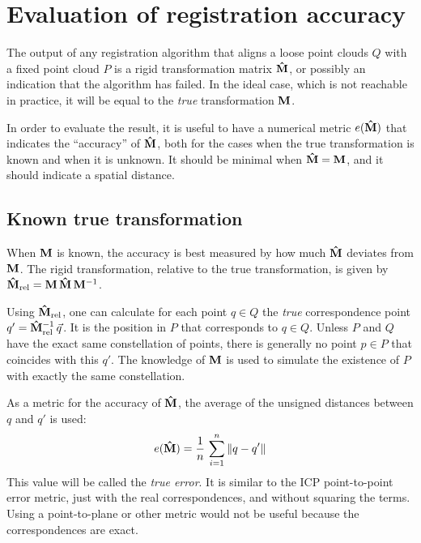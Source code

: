 \section{Evaluation of registration accuracy}
The output of any registration algorithm that aligns a loose point clouds $Q$ with a fixed point cloud $P$ is a rigid transformation matrix $\mathbf{\hat{M}}$, or possibly an indication that the algorithm has failed. In the ideal case, which is not reachable in practice, it will be equal to the \emph{true} transformation $\mathbf{M}$.

In order to evaluate the result, it is useful to have a numerical metric $e(\mathbf{\hat{M}})$ that indicates the ``accuracy'' of  $\mathbf{\hat{M}}$, both for the cases when the true transformation is known and when it is unknown. It should be minimal when $\mathbf{\hat{M}} = \mathbf{M}$, and it should indicate a spatial distance.



\subsection{Known true transformation} \label{sec:lm_known_ttrans}
When $\mathbf{M}$ is known, the accuracy is best measured by how much $\mathbf{\hat{M}}$ deviates from $\mathbf{M}$. The rigid transformation, relative to the true transformation, is given by $\mathbf{\hat{M}}_{\text{rel}} = \mathbf{M} \, \mathbf{\hat{M}} \, \mathbf{M}^{-1}$.

Using $\mathbf{\hat{M}}_{\text{rel}}$, one can calculate for each point $q \in Q$ the \emph{true} correspondence point $q' = \mathbf{\hat{M}}_{\text{rel}}^{-1} \, \vec{q}$. It is the position in $P$ that corresponds to $q \in Q$. Unless $P$ and $Q$ have the exact same constellation of points, there is generally no point $p \in P$ that coincides with this $q'$. The knowledge of $\mathbf{M}$ is used to simulate the existence of $P$ with exactly the same constellation.

As a metric for the accuracy of $\mathbf{\hat{M}}$, the average of the unsigned distances between $q$ and $q'$ is used:
\begin{equation}
e(\mathbf{\hat{M}}) = \frac{1}{n} \, \sum_{i=1}^{n} \| q - q' \|
\end{equation}
This value will be called the \emph{true error}. It is similar to the ICP point-to-point error metric, just with the real correspondences, and without squaring the terms. Using a point-to-plane or other metric would not be useful because the correspondences are exact.

